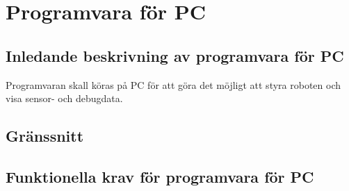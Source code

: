 \section{Programvara för PC}

\subsection{Inledande beskrivning av programvara för PC}
Programvaran skall köras på PC för att göra det möjligt att styra roboten och visa sensor- och debugdata.

\subsection{Gränssnitt}
\begin{LIPSkravlista}
\end{LIPSkravlista}

\subsection{Funktionella krav för programvara för PC}
\begin{LIPSkravlista}
\end{LIPSkravlista}
